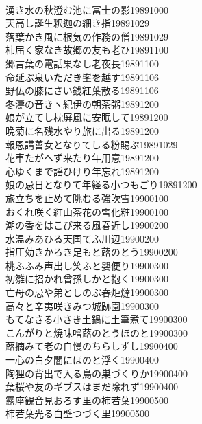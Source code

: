 \begin{multicols}{2}
\\湧き水の秋澄む池に冨士の影\hfill{19891000}
\\天高し誕生釈迦の細き指\hfill{19891029}
\\落葉かき風に根気の作務の僧\hfill{19891029}
\\柿届く家なき故郷の友も老ひ\hfill{19891100}
\\郷言葉の電話果なし老夜長\hfill{19891100}
\\命延ぶ泉いただき峯を越す\hfill{19891106}
\\野仏の膝にさい銭紅葉散る\hfill{19891106}
\\冬濤の音きヽ紀伊の朝茶粥\hfill{19891200}
\\娘が立てし枕屏風に安眠して\hfill{19891200}
\\晩菊に名残水やり旅に出る\hfill{19891200}
\\報恩講善女となりてしる粉賜ぶ\hfill{19891029}
\\花車たがへず来たり年用意\hfill{19891200}
\\心ゆくまで謡ひけり年忘れ\hfill{19891200}
\\娘の忌日となりて年経る小つもごり\hfill{19891200}
\\旅立ちを止めて眺むる強吹雪\hfill{19900100}
\\おくれ咲く紅山茶花の雪化粧\hfill{19900100}
\\潮の香をはこび来る風春近し\hfill{19900200}
\\水温みあひる天国てふ川辺\hfill{19900200}
\\指圧効きかろき足もと蕗のとう\hfill{19900200}
\\桃ふふみ声出し笑ふと嬰便り\hfill{19900300}
\\初雛に招かれ曾孫しかと抱く\hfill{19900300}
\\亡母の忌や弟としのぶ春炬燵\hfill{19900300}
\\高々と辛夷咲きみつ城跡園\hfill{19900300}
\\もてなさる小さき土鍋に土筆煮て\hfill{19900300}
\\こんがりと焼味噌蕗のとうほのと\hfill{19900300}
\\蕗摘みて老の自慢のちらしずし\hfill{19900400}
\\一心の白夕闇にほのと浮く\hfill{19900400}
\\陶狸の背出で入る鳥の巣づくりか\hfill{19900400}
\\葉桜や友のギブスはまだ除れず\hfill{19900400}
\\露座観音見おろす里の柿若葉\hfill{19900500}
\\柿若葉光る白壁つづく里\hfill{19900500}

\end{multicols}
